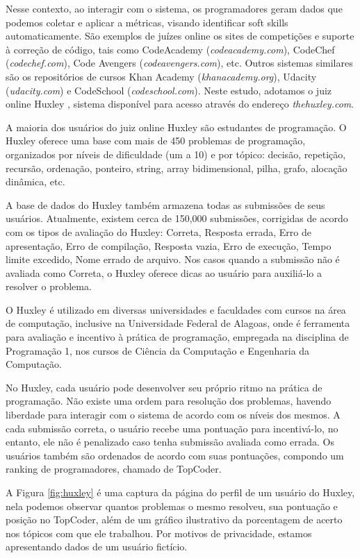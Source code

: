 Nesse contexto, ao interagir com o sistema, os programadores geram dados que podemos coletar e aplicar a métricas, visando identificar soft skills automaticamente.
São exemplos de juízes online os sites de competições e suporte à correção de código, tais como CodeAcademy (\textit{codeacademy.com}), CodeChef (\textit{codechef.com}), Code Avengers (\textit{codeavengers.com}), etc.
Outros sistemas similares são os repositórios de cursos Khan Academy (\textit{khanacademy.org}), Udacity (\textit{udacity.com}) e CodeSchool (\textit{codeschool.com}).
Neste estudo, adotamos o juiz online Huxley \cite{paes:13}, sistema disponível para acesso através do endereço \textit{thehuxley.com}.

A maioria dos usuários do juiz online Huxley são estudantes de programação. O Huxley oferece uma base com mais de 450 problemas de programação, organizados por níveis de dificuldade (um a 10) e por tópico: decisão, repetição, recursão, ordenação, ponteiro, string, array bidimensional, pilha, grafo, alocação dinâmica, etc.

A base de dados do Huxley também armazena todas as submissões de seus usuários. Atualmente, existem cerca de 150,000 submissões, corrigidas de acordo com os tipos de avaliação do Huxley: Correta, Resposta errada, Erro de apresentação, Erro de compilação, Resposta vazia, Erro de execução, Tempo limite excedido, Nome errado de arquivo. 
Nos casos quando a submissão não é avaliada como Correta, o Huxley oferece dicas ao usuário para auxiliá-lo a resolver o problema. 

O Huxley é utilizado em diversas universidades e faculdades com cursos na área de computação, inclusive na Universidade Federal de Alagoas, onde é ferramenta para avaliação e incentivo à prática de programação, empregada na disciplina de Programação 1, nos cursos de Ciência da Computação e Engenharia da Computação.

No Huxley, cada usuário pode desenvolver seu próprio ritmo na prática de programação. Não existe uma ordem para resolução dos problemas, havendo liberdade para interagir com o sistema de acordo com os níveis dos mesmos. A cada submissão correta, o usuário recebe uma pontuação para incentivá-lo, no entanto, ele não é penalizado caso tenha submissão avaliada como errada. Os usuários também são ordenados de acordo com suas pontuações, compondo um ranking de programadores, chamado de TopCoder.

A Figura \ref{fig:huxley} é uma captura da página do perfil de um usuário do Huxley, nela podemos observar quantos problemas o mesmo resolveu, sua pontuação e posição no TopCoder, além de um gráfico ilustrativo da porcentagem de acerto nos tópicos com que ele trabalhou.
Por motivos de privacidade, estamos apresentando dados de um usuário fictício.

